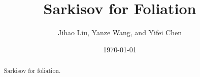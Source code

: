 \documentclass[11pt]{amsart}
\numberwithin{equation}{section}
\newcommand{\bb}{\bm{b}}
\newcommand{\Qq}{\mathbb{Q}}
\theoremstyle{definition}
\theoremstyle{definition}
\theoremstyle{definition}
\begin{document}
\title{Sarkisov for Foliation}
\author{ Jihao Liu, Yanze Wang, and Yifei Chen}

\date{\today}

\begin{abstract}
  Sarkisov for foliation.
\end{abstract}




\end{document}
